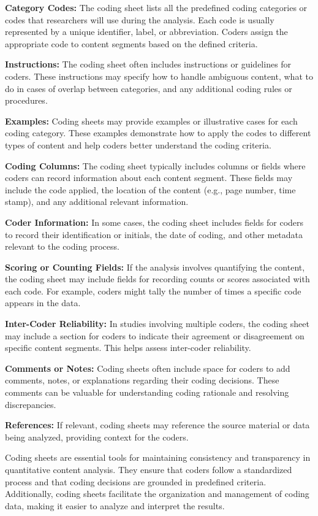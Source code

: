 \documentclass[
  b5paper]{book}
\begin{document}
\textbf{Category Codes:} The coding sheet lists all the predefined coding categories or codes that researchers will use during the analysis. Each code is usually represented by a unique identifier, label, or abbreviation. Coders assign the appropriate code to content segments based on the defined criteria.

\textbf{Instructions:} The coding sheet often includes instructions or guidelines for coders. These instructions may specify how to handle ambiguous content, what to do in cases of overlap between categories, and any additional coding rules or procedures.

\textbf{Examples:} Coding sheets may provide examples or illustrative cases for each coding category. These examples demonstrate how to apply the codes to different types of content and help coders better understand the coding criteria.

\textbf{Coding Columns:} The coding sheet typically includes columns or fields where coders can record information about each content segment. These fields may include the code applied, the location of the content (e.g., page number, time stamp), and any additional relevant information.

\textbf{Coder Information:} In some cases, the coding sheet includes fields for coders to record their identification or initials, the date of coding, and other metadata relevant to the coding process.

\textbf{Scoring or Counting Fields:} If the analysis involves quantifying the content, the coding sheet may include fields for recording counts or scores associated with each code. For example, coders might tally the number of times a specific code appears in the data.

\textbf{Inter-Coder Reliability:} In studies involving multiple coders, the coding sheet may include a section for coders to indicate their agreement or disagreement on specific content segments. This helps assess inter-coder reliability.

\textbf{Comments or Notes:} Coding sheets often include space for coders to add comments, notes, or explanations regarding their coding decisions. These comments can be valuable for understanding coding rationale and resolving discrepancies.

\textbf{References:} If relevant, coding sheets may reference the source material or data being analyzed, providing context for the coders.

Coding sheets are essential tools for maintaining consistency and transparency in quantitative content analysis. They ensure that coders follow a standardized process and that coding decisions are grounded in predefined criteria. Additionally, coding sheets facilitate the organization and management of coding data, making it easier to analyze and interpret the results.
\end{document}

